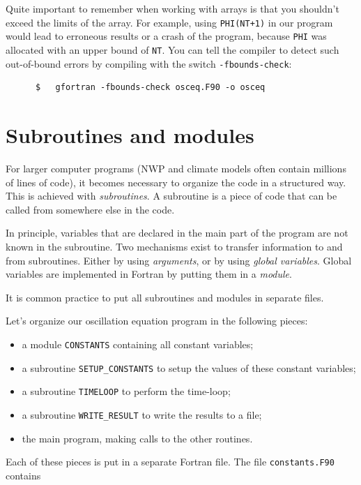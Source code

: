 \documentclass[a4paper]{article}
\begin{document}
%
\par
Quite important to remember when working with arrays is that you shouldn't exceed the limits of the array. For example, using \verb|PHI(NT+1)| in our program would lead to erroneous results or a crash of the program, because \verb+PHI+ was allocated with an upper bound of \verb+NT+. You can tell the compiler to detect such out-of-bound errors by compiling with the switch \verb+-fbounds-check+:
%
\begin{verbatim}
	  $   gfortran -fbounds-check osceq.F90 -o osceq
\end{verbatim}
%
\section{Subroutines and modules}
%
\par
For larger computer programs (NWP and climate models often contain millions of lines of code), it becomes necessary to organize the code in a structured way. This is achieved with \emph{subroutines}. A subroutine is a piece of code that can be called from somewhere else in the code.
%
\par
In principle, variables that are declared in the main part of the program are not known in the subroutine. Two mechanisms exist to transfer information to and from subroutines. Either by using \emph{arguments}, or by using \emph{global variables}. Global variables are implemented in Fortran by putting them in a \emph{module}.
%
\par
It is common practice to put all subroutines and modules in separate files.
%
\par
Let's organize our oscillation equation program in the following pieces:
%
\begin{itemize}
	\item a module \verb+CONSTANTS+ containing all constant variables;
	\item a subroutine \verb+SETUP_CONSTANTS+ to setup the values of these constant variables;
	\item a subroutine \verb+TIMELOOP+ to perform the time-loop;
	\item a subroutine \verb+WRITE_RESULT+ to write the results to a file;
	\item the main program, making calls to the other routines.
\end{itemize}
%
\par
Each of these pieces is put in a separate Fortran file. The file \verb+constants.F90+ contains
%
\end{document}
